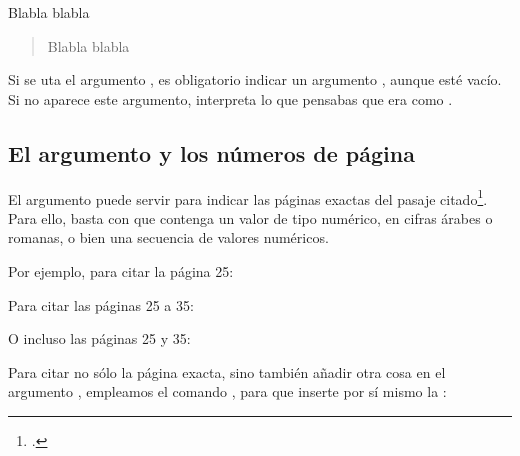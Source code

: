 \begin{latexcode}
Blabla \autocite[Véase también][que trata sobre un tema parecido.]{Saxer1980} blabla
\end{latexcode}

\begin{quotation}
Blabla \cite[Véase también][que trata sobre un tema parecido.]{Saxer1980} blabla
\end{quotation}

\begin{attention}
  Si se uta el argumento , es obligatorio indicar un
  argumento  , aunque esté vacío. Si no aparece este
  argumento,   interpreta lo que pensabas que era
   como .
\end{attention}

\subsection{El argumento  y los números de página}\label{pagespostnote}

El argumento  puede servir para indicar las páginas
exactas del pasaje citado\footcite[Para más detalles, consúltese:
][]{biblatex_pages}. Para ello, basta con que contenga un valor de
tipo numérico, en cifras árabes o romanas, o bien una secuencia de
valores numéricos.

Por ejemplo, para citar la página 25:

\begin{latexcode}
\autocite[25]{Saxer1980}
\end{latexcode}

 Para citar las páginas 25 a 35:

\begin{latexcode}
\autocite[25-35]{Saxer1980}
\end{latexcode}

O incluso las páginas 25 y 35:

\begin{latexcode}
\autocite[25 \& 35]{Saxer1980}
\end{latexcode}

Para citar no sólo la página exacta, sino también añadir otra cosa en
el argumento , empleamos el comando  ,
para que  inserte por sí mismo la  :

\begin{latexcode}
\autocite[\pno~22,  con el que estamos en desacuerdo.]{Saxer1980}
\end{latexcode}

